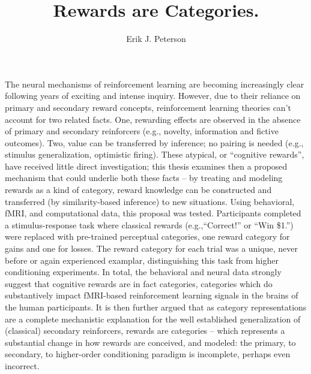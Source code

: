 \documentclass[doc,12pt]{apa}        %
\title{Rewards are Categories.}
\author{Erik J. Peterson} \affiliation{Dept. of Psychology \\ Colorado State University \\ Fort Collins, CO}
\begin{document}
\maketitle
\newpage
The neural mechanisms of reinforcement learning are becoming increasingly clear following years of exciting and intense inquiry.  However, due to their reliance on primary and secondary reward concepts, reinforcement learning theories can't account for two related facts.  One, rewarding effects are observed in the absence of primary and secondary reinforcers (e.g., novelty, information and fictive outcomes).  Two, value can be transferred by inference; no pairing is needed (e.g., stimulus generalization, optimistic firing).  These atypical, or ``cognitive rewards'', have received little direct investigation; this thesis examines then a proposed mechanism that could underlie both these facts -- by treating and modeling rewards as a kind of category, reward knowledge can be constructed and transferred (by similarity-based inference) to new situations.  Using behavioral, fMRI, and computational data, this proposal was tested.  Participants completed a stimulus-response task where classical rewards (e.g.,``Correct!'' or ``Win \$1.'') were replaced with pre-trained perceptual categories, one reward category for gains and one for losses.  The reward category for each trial was a unique, never before or again experienced examplar, distinguishing this task from higher conditioning experiments. In total, the behavioral and neural data strongly suggest that cognitive rewards are in fact categories, categories which do substantively impact fMRI-based reinforcement learning signals in the brains of the human participants.  It is then further argued that as category representations are a complete mechanistic explanation for the well established generalization of (classical) secondary reinforcers, rewards are categories -- which represents a substantial change in how rewards are conceived, and modeled: the primary, to secondary, to higher-order conditioning paradigm is incomplete, perhaps even incorrect.
\clearpage
\newpage
\tableofcontents
\newpage
\doublespace

\newpage

\newpage

\newpage

\newpage

\end{document}
